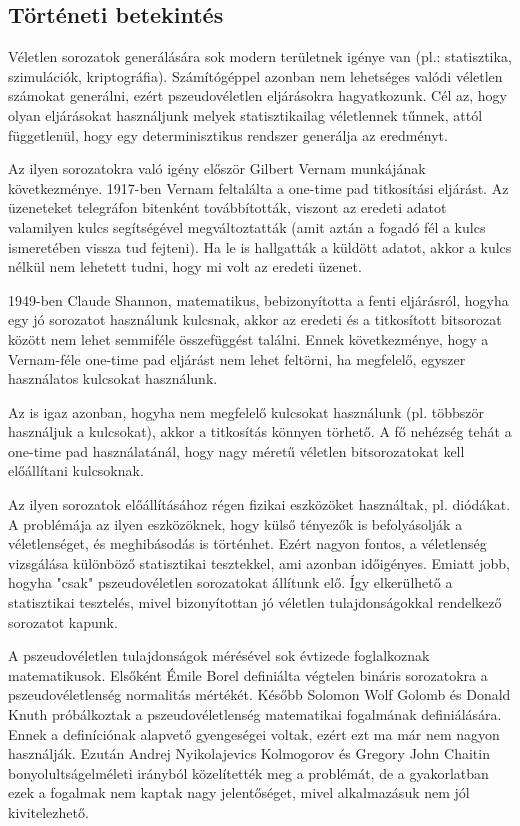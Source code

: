 \documentclass[12pt]{article}
\begin{document}
	\subsection{Történeti betekintés}
	Véletlen sorozatok generálására sok modern területnek igénye van (pl.: statisztika, szimulációk, kriptográfia). Számítógéppel azonban nem lehetséges valódi véletlen számokat generálni, ezért pszeudovéletlen eljárásokra hagyatkozunk. Cél az, hogy olyan eljárásokat használjunk melyek statisztikailag véletlennek tűnnek, attól függetlenül, hogy egy determinisztikus rendszer generálja az eredményt.
	\par
	Az ilyen sorozatokra való igény először Gilbert Vernam munkájának következménye. 1917-ben Vernam feltalálta a one-time pad titkosítási eljárást. Az üzeneteket telegráfon bitenként továbbították, viszont az eredeti adatot valamilyen kulcs segítségével megváltoztatták (amit aztán a fogadó fél a kulcs ismeretében vissza tud fejteni). Ha le is hallgatták a küldött adatot, akkor a kulcs nélkül nem lehetett tudni, hogy mi volt az eredeti üzenet.
	\par
	1949-ben Claude Shannon, matematikus, bebizonyította a fenti eljárásról, hogyha egy jó sorozatot használunk kulcsnak, akkor az eredeti és a titkosított bitsorozat között nem lehet semmiféle összefüggést találni. Ennek következménye, hogy a Vernam-féle one-time pad eljárást nem lehet feltörni, ha megfelelő, egyszer használatos kulcsokat használunk.
	\par
	Az is igaz azonban, hogyha nem megfelelő kulcsokat használunk (pl. többször használjuk a kulcsokat), akkor a titkosítás könnyen törhető. A fő nehézség tehát a one-time pad használatánál, hogy nagy méretű véletlen bitsorozatokat kell előállítani kulcsoknak.
	\par
	Az ilyen sorozatok előállításához régen fizikai eszközöket használtak, pl. diódákat. A problémája az ilyen eszközöknek, hogy külső tényezők is befolyásolják a véletlenséget, és meghibásodás is történhet. Ezért nagyon fontos, a véletlenség vizsgálása különböző statisztikai tesztekkel, ami azonban időigényes. Emiatt jobb, hogyha "csak" pszeudovéletlen sorozatokat állítunk elő. Így elkerülhető a statisztikai tesztelés, mivel bizonyítottan jó véletlen tulajdonságokkal rendelkező sorozatot kapunk.
	\par
	A pszeudovéletlen tulajdonságok mérésével sok évtizede foglalkoznak matematikusok. Elsőként Émile Borel definiálta végtelen bináris sorozatokra a pszeudovéletlenség normalitás mértékét. Később Solomon Wolf Golomb és Donald Knuth próbálkoztak a pszeudovéletlenség matematikai fogalmának definiálására. Ennek a definíciónak alapvető gyengeségei voltak, ezért ezt ma már nem nagyon használják. Ezután Andrej Nyikolajevics Kolmogorov és Gregory John Chaitin bonyolultságelméleti irányból közelítették meg a problémát, de a gyakorlatban ezek a fogalmak nem kaptak nagy jelentőséget, mivel alkalmazásuk nem jól kivitelezhető.
\end{document}
